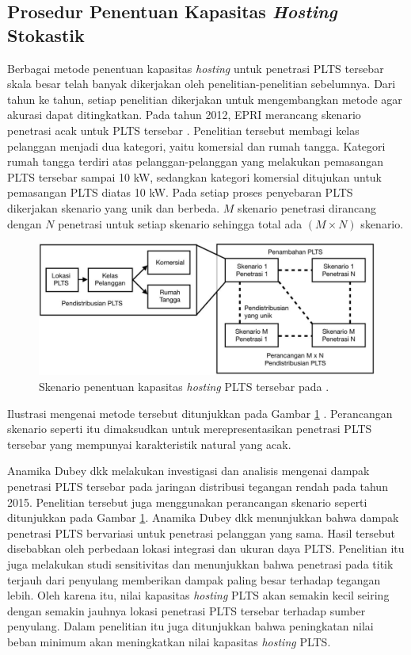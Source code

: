 {{{\subsection{Prosedur Penentuan Kapasitas \textit{Hosting} Stokastik}
Berbagai metode penentuan kapasitas \textit{hosting} untuk penetrasi PLTS tersebar skala besar telah banyak dikerjakan oleh penelitian-penelitian sebelumnya. Dari tahun ke tahun, setiap penelitian dikerjakan untuk mengembangkan metode agar akurasi dapat ditingkatkan. Pada tahun 2012, EPRI merancang skenario penetrasi acak untuk PLTS tersebar \cite{Epri2012,Smith2015}. Penelitian tersebut membagi kelas pelanggan menjadi dua kategori, yaitu komersial dan rumah tangga. Kategori rumah tangga terdiri atas pelanggan-pelanggan yang melakukan pemasangan PLTS tersebar sampai 10 kW, sedangkan kategori komersial ditujukan untuk pemasangan PLTS diatas 10 kW. Pada setiap proses penyebaran PLTS dikerjakan skenario yang unik dan berbeda. $M$ skenario penetrasi dirancang dengan $N$ penetrasi untuk setiap skenario sehingga total ada $(M\times N)$ skenario.
\begin{figure}[!h]
	\centering
	\includegraphics[width=1\textwidth]{Fig/Epri2012}
	\caption{Skenario penentuan kapasitas \textit{hosting} PLTS tersebar pada \cite{Epri2012}.}
	\label{Epri2012}
\end{figure}
Ilustrasi mengenai metode tersebut ditunjukkan pada Gambar \ref{Epri2012} \cite{Epri2012}. 
Perancangan skenario seperti itu dimaksudkan untuk merepresentasikan penetrasi PLTS tersebar yang mempunyai karakteristik natural yang acak.

Anamika Dubey dkk melakukan investigasi dan analisis mengenai dampak penetrasi PLTS tersebar pada jaringan distribusi tegangan rendah \cite{Dubey2015} pada tahun 2015. Penelitian tersebut juga menggunakan perancangan skenario seperti ditunjukkan pada Gambar \ref{Epri2012}. Anamika Dubey dkk menunjukkan bahwa dampak penetrasi PLTS bervariasi untuk penetrasi pelanggan yang sama. Hasil tersebut disebabkan oleh perbedaan lokasi integrasi dan ukuran daya PLTS. Penelitian itu juga melakukan studi sensitivitas dan menunjukkan bahwa penetrasi pada titik terjauh dari penyulang memberikan dampak paling besar terhadap tegangan lebih. Oleh karena itu, nilai kapasitas \textit{hosting} PLTS akan semakin kecil seiring dengan semakin jauhnya lokasi penetrasi PLTS tersebar terhadap sumber penyulang. Dalam penelitian itu juga ditunjukkan bahwa peningkatan nilai beban minimum akan meningkatkan nilai kapasitas \textit{hosting} PLTS. 

}}}
